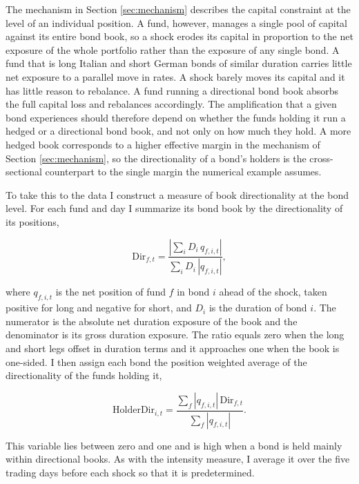 \documentclass[english, 11pt, oneside]{article}
\begin{document}
The mechanism in Section \ref{sec:mechanism} describes the capital constraint at the level of an individual position. A fund, however, manages a single pool of capital against its entire bond book, so a shock erodes its capital in proportion to the net exposure of the whole portfolio rather than the exposure of any single bond. A fund that is long Italian and short German bonds of similar duration carries little net exposure to a parallel move in rates. A shock barely moves its capital and it has little reason to rebalance. A fund running a directional bond book absorbs the full capital loss and rebalances accordingly. The amplification that a given bond experiences should therefore depend on whether the funds holding it run a hedged or a directional bond book, and not only on how much they hold. A more hedged book corresponds to a higher effective margin in the mechanism of Section \ref{sec:mechanism}, so the directionality of a bond's holders is the cross-sectional counterpart to the single margin the numerical example assumes.

To take this to the data I construct a measure of book directionality at the bond level. For each fund and day I summarize its bond book by the directionality of its positions,

\begin{equation}
\text{Dir}_{f,t} = \frac{\left| \sum_{i} D_{i}\, q_{f,i,t} \right|}{\sum_{i} D_{i}\, \left| q_{f,i,t} \right|} ,
\end{equation}

\noindent where $q_{f,i,t}$ is the net position of fund $f$ in bond $i$ ahead of the shock, taken positive for long and negative for short, and $D_{i}$ is the duration of bond $i$. The numerator is the absolute net duration exposure of the book and the denominator is its gross duration exposure. The ratio equals zero when the long and short legs offset in duration terms and it approaches one when the book is one-sided. I then assign each bond the position weighted average of the directionality of the funds holding it,

\begin{equation}
\text{HolderDir}_{i,t} = \frac{\sum_{f} \left| q_{f,i,t} \right|\, \text{Dir}_{f,t}}{\sum_{f} \left| q_{f,i,t} \right|} .
\end{equation}

\noindent This variable lies between zero and one and is high when a bond is held mainly within directional books. As with the intensity measure, I average it over the five trading days before each shock so that it is predetermined.
\end{document}
